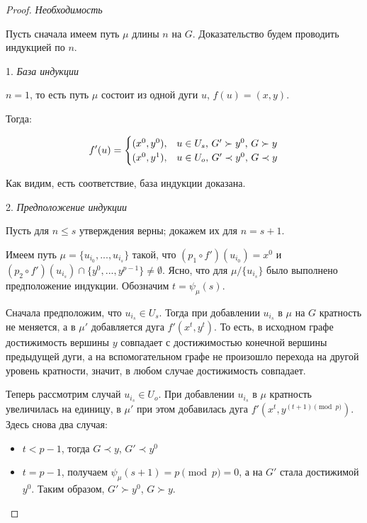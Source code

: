 \begin{proof}
	
	\textit {Необходимость}
	
	Пусть сначала имеем путь $\mu$ длины $n$ на $G$. Доказательство будем проводить индукцией по $n$.
	
	1. \textit {База индукции}
	
	$n = 1$, то есть путь $\mu$ состоит из одной дуги $u$, $f(u) = (x, y)$. 
	
	Тогда:
	
	\begin{equation*}
	f'(u) = 
	\begin{cases}
	(x^0, y^0), &\text{$ u \in U_s$, $G' \succ y^0$, $G \succ y$}\\
	(x^0, y^1), &\text{$ u \in U_o$, $G' \prec y^0$, $G \prec y$}
	\end{cases}
	\end{equation*} 
	
	Как видим, есть соответствие, база индукции доказана.
	
	2. \textit {Предположение индукции}
	
	Пусть для $ n \leq s$ утверждения верны; докажем их для $ n = s + 1$.
	
	Имеем путь $\mu = \{u_{i_0}, ... , u_{i_s}\}$ такой, что $(p_1 \circ f')(u_{i_0}) = x^0$ и $(p_2 \circ f')(u_{i_s}) \cap \{y^0, ... , y^{p-1}\} \neq \emptyset$. Ясно, что для $\mu / \{u_{i_s}\}$ было выполнено предположение индукции. Обозначим $t = \psi_\mu(s)$.
	
	Сначала предположим, что $u_{i_s} \in U_s$. Тогда при добавлении $u_{i_s}$ в $\mu$ на $G$ кратность не меняется, а в $\mu'$ добавляется дуга $f'(x^t, y^t)$. То есть, в исходном графе достижимость вершины $y$ совпадает с достижимостью конечной вершины предыдущей дуги, а на вспомогательном графе не произошло перехода на другой уровень кратности, значит, в любом случае достижимость совпадает. 
	
	Теперь рассмотрим случай $u_{i_s} \in U_o$. При добавлении $u_{i_s}$ в $\mu$ кратность увеличилась на единицу, в $\mu'$ при этом добавилась дуга $f'(x^t, y^{(t+1) \pmod p})$. Здесь снова два случая:
	
	\begin{itemize}
		\item $t < p - 1$, тогда  $G \prec y$, $G' \prec y^0$
		\item $t = p - 1$, получаем $\psi_\mu(s+1) = p\pmod p = 0$, а на $G'$ стала достижимой $y^0$. Таким образом, $G' \succ y^0$, $G \succ y$.
	\end{itemize}
	

\end{proof}
